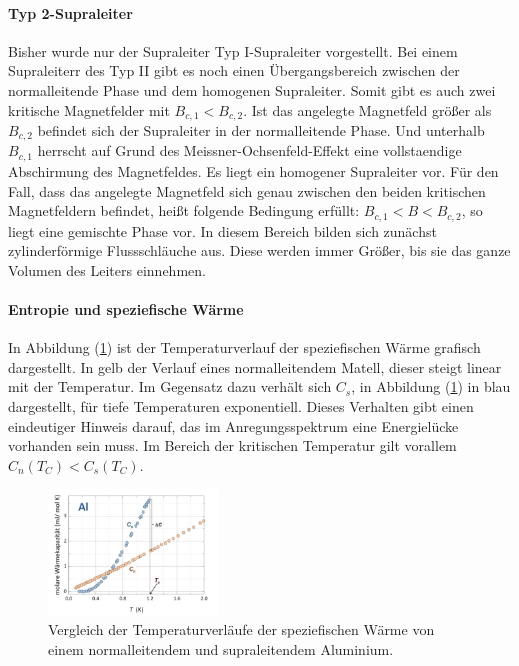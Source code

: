 \paragraph{Typ 2-Supraleiter}
Bisher wurde nur der Supraleiter Typ I-Supraleiter vorgestellt.
Bei einem Supraleiterr des Typ II gibt es noch einen \"{U}bergangsbereich zwischen der normalleitende Phase und dem homogenen Supraleiter.
Somit gibt es auch zwei kritische Magnetfelder mit $B_{c,1} < B_{c,2}$.
Ist das angelegte Magnetfeld gr\"{o}{\ss}er als $B_{c,2}$ befindet sich der Supraleiter in der normalleitende Phase.
Und unterhalb $B_{c,1}$ herrscht auf Grund des Meissner-Ochsenfeld-Effekt eine vollstaendige Abschirmung des Magnetfeldes.
Es liegt ein homogener Supraleiter vor.
F\"{u}r den Fall, dass das angelegte Magnetfeld sich genau zwischen den beiden kritischen Magnetfeldern befindet, hei{\ss}t folgende Bedingung erf\"{u}llt: $B_{c,1} < B < B_{c,2}$, so liegt eine gemischte Phase vor.
In diesem Bereich bilden sich zun\"{a}chst zylinderf\"{o}rmige Flussschl\"{a}uche aus.
Diese werden immer Gr\"{o}{\ss}er, bis sie das ganze Volumen des Leiters einnehmen.

\paragraph{Entropie und speziefische W\"{a}rme}
In Abbildung (\ref{abb:spezWaerme}) ist der Temperaturverlauf der speziefischen W\"{a}rme grafisch dargestellt.
In gelb der Verlauf eines normalleitendem Matell, dieser steigt linear mit der Temperatur.
Im Gegensatz dazu verh\"{a}lt sich $C_s$, in Abbildung (\ref{abb:spezWaerme}) in blau dargestellt, f\"ur tiefe Temperaturen exponentiell.
Dieses Verhalten gibt einen eindeutiger Hinweis darauf, das im Anregungsspektrum eine Energiel\"ucke vorhanden sein muss.
Im Bereich der kritischen Temperatur gilt vorallem $C_n(T_C) < C_s(T_C)$.
\begin{figure}[hbtp]
	\centering
	\includegraphics[width=0.4\textwidth]{Plots/spezWaerme.png}
	\caption{Vergleich der Temperaturverl\"{a}ufe der speziefischen W\"{a}rme von einem normalleitendem und supraleitendem Aluminium.}
	\label{abb:spezWaerme}
\end{figure}


